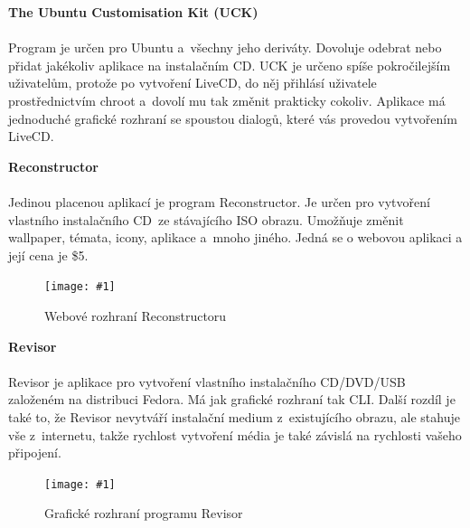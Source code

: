 \documentclass[a4paper,12pt]{article}
\newcommand{\nadpis}[1]{%
	\vspace{4 mm}
	\textbf{#1}\\
	\vspace{4 mm}
	}
\newcommand{\obr}[3]{%
	\begin{figure}[h]
	\center\texttt{[image: \#1]}
	\caption{#3}
	\end{figure}
	}
\begin{document}
\nadpis{The Ubuntu Customisation Kit (UCK)}\\ \label{sec:UCK}
Program je určen pro Ubuntu a~všechny jeho deriváty. Dovoluje odebrat nebo přidat jakékoliv aplikace na instalačním CD. UCK je určeno spíše pokročilejším uživatelům, protože po vytvoření LiveCD, do něj přihlásí uživatele prostřednictvím chroot a~dovolí mu tak změnit prakticky cokoliv. Aplikace má jednoduché grafické rozhraní se spoustou dialogů, které vás provedou vytvořením LiveCD.\cite{Linux_Build}


\nadpis{Reconstructor}\\
Jedinou placenou aplikací je program Reconstructor. Je určen pro vytvoření vlastního instalačního CD ze stávajícího ISO obrazu. Umožňuje změnit wallpaper, témata, icony, aplikace a~mnoho jiného.
Jedná se o webovou aplikaci a její cena je \$5.\cite{Linux_Build}
\begin{center}
\obr{./img/screens/reconstructor.jpg}{0.5}{Webové rozhraní Reconstructoru}
\end{center}

\newpage
\nadpis{Revisor}\\
Revisor je aplikace pro vytvoření vlastního instalačního CD/DVD/USB založeném na distribuci Fedora. Má jak grafické rozhraní tak CLI. Další rozdíl je také to, že Revisor nevytváří instalační medium z~existujícího obrazu, ale stahuje vše z~internetu, takže rychlost vytvoření média je také závislá na rychlosti vašeho připojení.\cite{Linux_Build}
\begin{center}
\obr{./img/screens/revisor.jpg}{0.7}{Grafické rozhraní programu Revisor}
\end{center}

\end{document}
